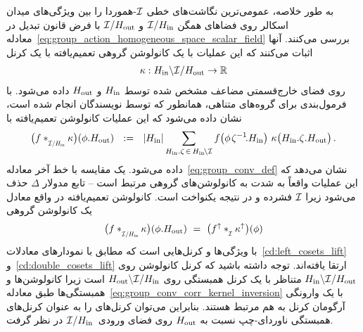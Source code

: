به طور خلاصه، \citet{Kondor2018-GENERAL} عمومی‌ترین نگاشت‌های خطی $\mathcal{I}$-هموردا را بین ویژگی‌های میدان اسکالر روی فضاهای همگن $\mathcal{I}/H_{\textup{in}}$ و $\mathcal{I}/H_{\textup{out}}$ با فرض قانون تبدیل در معادله~\eqref{eq:group_action_homogeneous_space_scalar_field} بررسی می‌کنند.
آنها اثبات می‌کنند که این عملیات با یک کانولوشن گروهی تعمیم‌یافته با یک کرنل
\begin{align}
	\kappa: H_{\textup{in}}\backslash \mathcal{I}/H_{\textup{out}} \to \mathbb{R}
\end{align}
روی فضای خارج‌قسمتی مضاعف مشخص شده توسط $H_{\textup{in}}$ و $H_{\textup{out}}$ داده می‌شود.
با فرمول‌بندی برای گروه‌های متناهی، همانطور که توسط نویسندگان انجام شده است، نشان داده می‌شود که این عملیات کانولوشن تعمیم‌یافته با
\begin{align}\label{eq:quotient_space_conv_Kondor}
	\big(f \ast_{\overset{}{\scalebox{.64}{$\I/\Hin$}}} \kappa \big) (\phi.\Hout)
	\ \ :=\ \ |\Hin| \sum_{\Hin.\zeta \,\in\, \Hin\mkern-2.5mu\backslash\mkern-.5mu\I}
	f\big( \phi\mkern2mu \zeta^{-1}\!. \Hin\big)\ \kappa\big( \Hin.\zeta.\Hout \big) \,.
\end{align}
داده می‌شود. یک مقایسه با خط آخر معادله~\eqref{eq:group_conv_def} نشان می‌دهد که این عملیات واقعاً به شدت به کانولوشن‌های گروهی مرتبط است -- تابع مدولار $\Delta$ حذف می‌شود زیرا $\mathcal{I}$ فشرده و در نتیجه یکنواخت است.
کانولوشن تعمیم‌یافته در واقع معادل یک کانولوشن گروهی
\begin{align}
	\big(f \ast_{\overset{}{\scalebox{.64}{$\I/\Hin$}}} \kappa \big) (\phi.\Hout)
	\ =\ \big(f^\uparrow \ast_{\overset{}{\protect\scalebox{.64}{$\mkern-.5mu \I$}}} \kappa^\uparrow \big)(\phi)
\end{align}
با ویژگی‌ها و کرنل‌هایی است که مطابق با نمودارهای معادلات~\eqref{cd:left_cosets_lift} و~\eqref{cd:double_cosets_lift} ارتقا یافته‌اند.
توجه داشته باشید که کرنل کانولوشن روی $H_{\textup{in}}\backslash \mathcal{I}/H_{\textup{out}}$ متناظر با یک کرنل همبستگی روی $H_{\textup{out}}\backslash \mathcal{I}/H_{\textup{in}}$ است زیرا کانولوشن‌ها و همبستگی‌ها طبق معادله~\eqref{eq:group_conv_corr_kernel_inversion} با یک وارونگی آرگومان کرنل به هم مرتبط هستند.
بنابراین می‌توان کرنل‌های \citet{Kondor2018-GENERAL} را به عنوان کرنل‌های همبستگی ناوردای-چپ نسبت به $H_{\textup{out}}$ روی فضای ورودی~$\mathcal{I}/H_{\textup{in}}$ در نظر گرفت.


